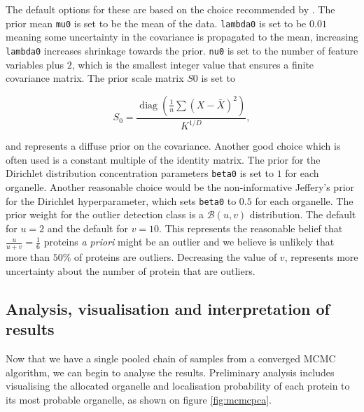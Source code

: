 \documentclass[9pt,a4paper,]{extarticle}
\begin{document}
The default options for these are based on the
choice recommended by \citep{Fraley:2005}. The prior mean \texttt{mu0} is set to
be the mean of the data. \texttt{lambda0} is set to be \(0.01\) meaning some
uncertainty in the covariance is propagated to the mean, increasing
\texttt{lambda0} increases shrinkage towards the prior. \texttt{nu0} is set to the
number of feature variables plus \(2\), which is the smallest integer
value that ensures a finite covariance matrix. The prior scale
matrix \(S0\) is set to

\begin{equation}
S_0 = \frac{\mathop{\mathrm{diag}}(\frac{1}{n}\sum (X - \bar{X})^2)}{K^{1/D}},
\end{equation}

and represents a diffuse prior on the covariance. Another good choice
which is often used is a constant multiple of the identity matrix. The
prior for the Dirichlet distribution concentration parameters \texttt{beta0}
is set to \(1\) for each organelle. Another
reasonable choice would be the non-informative Jeffery's prior for the
Dirichlet hyperparameter, which sets \texttt{beta0} to \(0.5\) for each
organelle. The prior weight for the outlier detection class is
a \(\mathcal{B}(u, v)\) distribution. The default for \(u = 2\) and the
default for \(v = 10\). This represents the reasonable belief that
\(\frac{u}{u + v} = \frac{1}{6}\)
proteins \emph{a priori} might be an outlier and we believe is unlikely that
more than \(50\%\) of proteins are outliers. Decreasing the value of \(v\),
represents more uncertainty about the number of protein that are
outliers.

\hypertarget{analysis-visualisation-and-interpretation-of-results}{%
\subsection{Analysis, visualisation and interpretation of results}\label{analysis-visualisation-and-interpretation-of-results}}

Now that we have a single pooled chain of samples from a converged MCMC
algorithm, we can begin to analyse the results. Preliminary analysis
includes visualising the allocated organelle and localisation
probability of each protein to its most probable organelle, as shown on
figure \ref{fig:mcmcpca}.
\end{document}
